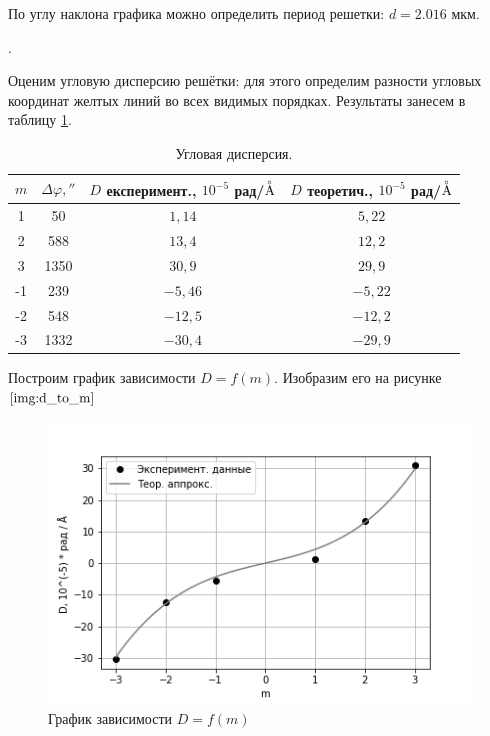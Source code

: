 \documentclass[a4paper, 12pt]{article}
\newcounter{Points}
\newcommand{\point}{\arabic{Points}. \addtocounter{Points}{1}}
\begin{document}
По углу наклона графика можно определить период решетки: $d = 2.016 $ мкм.

\point Оценим угловую дисперсию решётки: для этого определим разности угловых координат желтых линий во всех видимых порядках. Результаты занесем в таблицу \ref{tabl:disp}.

\begin{table}[H]
\centering
\begin{tabular}{|c|c|c|c|}
        \hline
        $m$  & $ \Delta \varphi , ''$  & $D$ експеримент.,  $ 10^{-5} $ рад/$  \buildrel _{\circ} \over {\mathrm{A}}$   & $D$ теоретич.,   $ 10^{-5} $ рад/$  \buildrel _{\circ} \over {\mathrm{A}}$   \\ \hline
        1  & 50      & $1,14$   & $5,22$  \\ \hline
        2  & 588     & $13,4$    & $12,2$  \\ \hline
        3  & 1350    & $30,9$    & $29,9$  \\ \hline
       -1  & 239     & $-5,46$   & $-5,22$ \\ \hline 
       -2  & 548     & $-12,5$   & $-12,2$ \\ \hline
       -3  & 1332    & $-30,4$  & $-29,9$ \\ \hline
\end{tabular}
\caption{Угловая дисперсия.}
\label{tabl:disp}
\end{table}

Построим график зависимости $D = f(m)$. Изобразим его на рисунке $\ref{img:d_to_m}$

\begin{figure}
    \centering
    \includegraphics[scale=1]{d_to_m.png}
    \caption{График зависимости $D = f(m)$}
    \label{img:d_to_m}
\end{figure}
\end{document}
